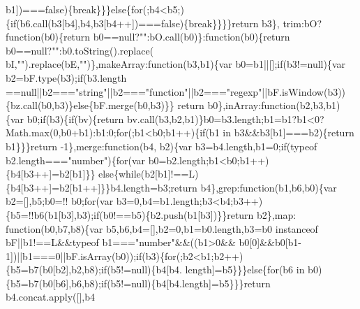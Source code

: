 \begin{DoxyCode}
      b1])===\textcolor{keyword}{false})\{\textcolor{keywordflow}{break}\}\}\}\textcolor{keywordflow}{else}\{\textcolor{keywordflow}{for}(;b4<b5;)\{\textcolor{keywordflow}{if}(b6.call(b3[b4],b4,b3[b4++])===\textcolor{keyword}{false})\{\textcolor{keywordflow}{break}\}\}\}\}\textcolor{keywordflow}{return} b3\},
      trim:bO?\textcolor{keyword}{function}(b0)\{\textcolor{keywordflow}{return} b0==null?\textcolor{stringliteral}{""}:bO.call(b0)\}:\textcolor{keyword}{function}(b0)\{\textcolor{keywordflow}{return} b0==null?\textcolor{stringliteral}{""}:b0.toString().replace(
      bI,\textcolor{stringliteral}{""}).replace(bE,\textcolor{stringliteral}{""})\},makeArray:\textcolor{keyword}{function}(b3,b1)\{var b0=b1||[];\textcolor{keywordflow}{if}(b3!=null)\{var b2=bF.type(b3);\textcolor{keywordflow}{if}(b3.length
      ==null||b2===\textcolor{stringliteral}{"string"}||b2===\textcolor{stringliteral}{"function"}||b2===\textcolor{stringliteral}{"regexp"}||bF.isWindow(b3))\{bz.call(b0,b3)\}\textcolor{keywordflow}{else}\{bF.merge(b0,b3)\}\}\textcolor{keywordflow}{
      return} b0\},inArray:\textcolor{keyword}{function}(b2,b3,b1)\{var b0;\textcolor{keywordflow}{if}(b3)\{\textcolor{keywordflow}{if}(bv)\{\textcolor{keywordflow}{return} bv.call(b3,b2,b1)\}b0=b3.length;b1=b1?b1<0?
      Math.max(0,b0+b1):b1:0;\textcolor{keywordflow}{for}(;b1<b0;b1++)\{\textcolor{keywordflow}{if}(b1 in b3&&b3[b1]===b2)\{\textcolor{keywordflow}{return} b1\}\}\}\textcolor{keywordflow}{return} -1\},merge:\textcolor{keyword}{function}(b4,
      b2)\{var b3=b4.length,b1=0;\textcolor{keywordflow}{if}(typeof b2.length===\textcolor{stringliteral}{"number"})\{\textcolor{keywordflow}{for}(var b0=b2.length;b1<b0;b1++)\{b4[b3++]=b2[b1]\}\}\textcolor{keywordflow}{
      else}\{\textcolor{keywordflow}{while}(b2[b1]!==L)\{b4[b3++]=b2[b1++]\}\}b4.length=b3;\textcolor{keywordflow}{return} b4\},grep:\textcolor{keyword}{function}(b1,b6,b0)\{var b2=[],b5;b0=!!
      b0;\textcolor{keywordflow}{for}(var b3=0,b4=b1.length;b3<b4;b3++)\{b5=!!b6(b1[b3],b3);\textcolor{keywordflow}{if}(b0!==b5)\{b2.push(b1[b3])\}\}\textcolor{keywordflow}{return} b2\},map:\textcolor{keyword}{
      function}(b0,b7,b8)\{var b5,b6,b4=[],b2=0,b1=b0.length,b3=b0 instanceof bF||b1!==L&&typeof b1===\textcolor{stringliteral}{"number"}&&((b1>0&&
      b0[0]&&b0[b1-1])||b1===0||bF.isArray(b0));\textcolor{keywordflow}{if}(b3)\{\textcolor{keywordflow}{for}(;b2<b1;b2++)\{b5=b7(b0[b2],b2,b8);\textcolor{keywordflow}{if}(b5!=null)\{b4[b4.
      length]=b5\}\}\}\textcolor{keywordflow}{else}\{\textcolor{keywordflow}{for}(b6 in b0)\{b5=b7(b0[b6],b6,b8);\textcolor{keywordflow}{if}(b5!=null)\{b4[b4.length]=b5\}\}\}\textcolor{keywordflow}{return} b4.concat.apply([],b4

\end{DoxyCode}
